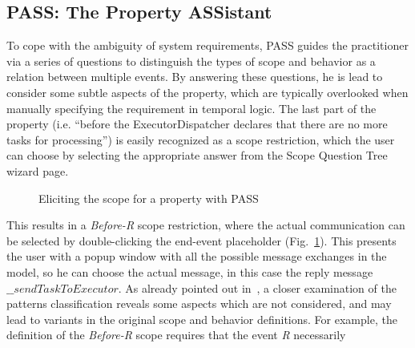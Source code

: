 \documentclass[letter]{llncs}
\begin{document}
\subsection{PASS: The Property ASSistant} 
\vspace{-6 pt}

To cope with the ambiguity of system requirements, PASS 
guides the practitioner via a series of questions to distinguish the types of scope and 
behavior as a relation between multiple events. By answering these questions, 
he is lead to consider some subtle aspects of the property, which are typically 
overlooked when manually specifying the requirement in temporal logic.
The last part of the property (i.e. ``before the ExecutorDispatcher
declares that there are no more tasks for processing'') is easily recognized as a scope restriction,
which the user can choose by selecting the appropriate answer from the Scope Question Tree wizard page.
\begin{figure}[!t]
\centering
{%
\setlength{\fboxsep}{1.5pt}%
\setlength{\fboxrule}{0.5pt}%
%
}%
\caption{Eliciting the scope for a property with PASS}
\label{fig:ScopePASS}
\end{figure}
This results in a \emph{Before-R} scope restriction, where the actual communication can be selected by double-clicking the end-event placeholder (Fig.~\ref{fig:ScopePASS}).
This presents the user with a popup window with all the possible message exchanges in the model, so he can choose the actual message, in this case
the reply message $\_\_sendTaskToExecutor$.
As already pointed out in~\cite{Smith02propel:an}, a closer examination of the patterns classification reveals some aspects
which are not considered, and may lead to variants in the original scope and behavior definitions. 
For example, the definition of the \emph{Before-R} scope requires that the event \emph{R} necessarily
\end{document}
